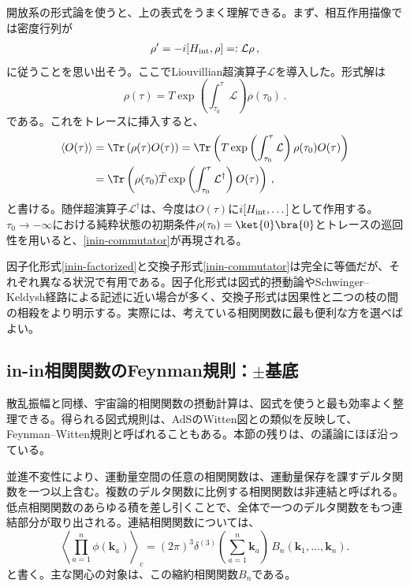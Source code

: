 \documentclass[a4paper,11pt,oneside]{article}
\theoremstyle{definition}
\numberwithin{equation}{section}
\newcommand{\ex}[1]{\langle #1 \rangle}
\renewcommand{\L}{\mathcal{L}}
\begin{document}
開放系の形式論を使うと、上の表式をうまく理解できる。まず、相互作用描像では密度行列が
\begin{align}
\rho'=-i[H_{\rm int},\rho]=:\L \rho\,,
\end{align}
に従うことを思い出そう。ここでLiouvillian超演算子$ \L$を導入した。形式解は
\[ \rho(\tau)=T \exp\left(  \int_{\tau_{0}}^{\tau}\L\right)\rho(\tau_{0})\,.\]
である。これをトレースに挿入すると、
\begin{align}
\ex{O(\tau)}&=\Tr\left(  \rho(\tau)O(\tau)\right)=\Tr\left(  T \exp\left(  \int_{\tau_{0}}^{\tau}\L\right)\rho(\tau_{0}) O(\tau)\right)\\
&=\Tr\left(  \rho(\tau_{0}) \bar T \exp\left(  \int_{\tau_{0}}^{\tau}\L^{\dagger}\right) O(\tau)\right)\,,
\end{align}
と書ける。随伴超演算子$ \L^{\dagger}$は、今度は$ O(\tau)$に$ i[H_{\rm int}, \dots]$として作用する。$ \tau_{0}\to-\infty$における純粋状態の初期条件$ \rho(\tau_{0})=\ket{0}\bra{0}$とトレースの巡回性を用いると、\eqref{inin-commutator}が再現される。




因子化形式\eqref{inin-factorized}と交換子形式\eqref{inin-commutator}は完全に等価だが、それぞれ異なる状況で有用である。因子化形式は図式的摂動論やSchwinger--Keldysh経路による記述に近い場合が多く、交換子形式は因果性と二つの枝の間の相殺をより明示する。実際には、考えている相関関数に最も便利な方を選べばよい。





\subsection{in-in相関関数のFeynman規則：$  \pm $基底}\label{sec5p4}



散乱振幅と同様、宇宙論的相関関数の摂動計算は、図式を使うと最も効率よく整理できる。得られる図式規則は、AdSのWitten図との類似を反映して、Feynman--Witten規則と呼ばれることもある。本節の残りは、\cite{Goodhew:2023bcu,PajerFieldTheoryCosmologyNotes}の議論にほぼ沿っている。



並進不変性により、運動量空間の任意の相関関数は、運動量保存を課すデルタ関数を一つ以上含む。複数のデルタ関数に比例する相関関数は非連結と呼ばれる。低点相関関数のあらゆる積を差し引くことで、全体で一つのデルタ関数をもつ連結部分が取り出される。連結相関関数については、
\begin{equation}
\left\langle \prod_{a=1}^n \phi(\mathbf k_a)\right\rangle_c
=
(2\pi)^3\delta^{(3)}\!\left(\sum_{a=1}^n \mathbf k_a\right)\,
B_n(\mathbf k_1,\dots,\mathbf k_n) .
\end{equation}
と書く。主な関心の対象は、この縮約相関関数\(B_n\)である。
\end{document}

